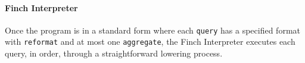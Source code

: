 


\paragraph{Finch Interpreter} 
Once the program is in a standard form where each \texttt{query} has a specified format with \texttt{reformat} and at most one \texttt{aggregate}, the Finch Interpreter executes each query, in order, through a straightforward lowering process.
%


